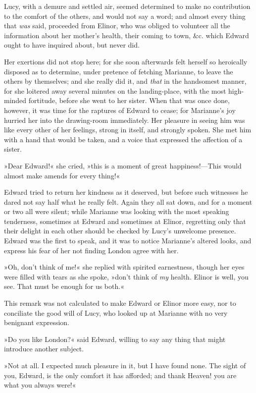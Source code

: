 Lucy, with a demure and settled air, seemed determined to make no contribution to the comfort of the others, and would not say a word; and almost every thing that \textit{was} said, proceeded from Elinor, who was obliged to volunteer all the information about her mother’s health, their coming to town, \&c. which Edward ought to have inquired about, but never did.

Her exertions did not stop here; for she soon afterwards felt herself so heroically disposed as to determine, under pretence of fetching Marianne, to leave the others by themselves; and she really did it, and \textit{that} in the handsomest manner, for she loitered away several minutes on the landing-place, with the most high-minded fortitude, before she went to her sister. When that was once done, however, it was time for the raptures of Edward to cease; for Marianne’s joy hurried her into the drawing-room immediately. Her pleasure in seeing him was like every other of her feelings, strong in itself, and strongly spoken. She met him with a hand that would be taken, and a voice that expressed the affection of a sister.

»Dear Edward!« she cried, »this is a moment of great happiness!—This would almost make amends for every thing!«

Edward tried to return her kindness as it deserved, but before such witnesses he dared not say half what he really felt. Again they all sat down, and for a moment or two all were silent; while Marianne was looking with the most speaking tenderness, sometimes at Edward and sometimes at Elinor, regretting only that their delight in each other should be checked by Lucy’s unwelcome presence. Edward was the first to speak, and it was to notice Marianne’s altered looks, and express his fear of her not finding London agree with her.

»Oh, don’t think of me!« she replied with spirited earnestness, though her eyes were filled with tears as she spoke, »don’t think of \textit{my} health. Elinor is well, you see. That must be enough for us both.«

This remark was not calculated to make Edward or Elinor more easy, nor to conciliate the good will of Lucy, who looked up at Marianne with no very benignant expression.

»Do you like London?« said Edward, willing to say any thing that might introduce another subject.

»Not at all. I expected much pleasure in it, but I have found none. The sight of you, Edward, is the only comfort it has afforded; and thank Heaven! you are what you always were!«

